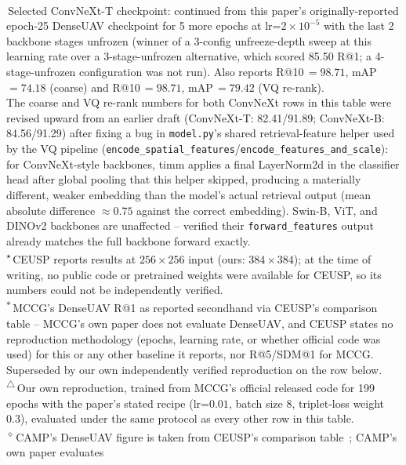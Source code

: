 \documentclass[conference]{IEEEtran}
\begin{document}
\begin{table}[htbp]
\vspace{2pt}
{\footnotesize
\textsuperscript{\ddag}\,Selected ConvNeXt-T checkpoint: continued from this
paper's originally-reported epoch-25 DenseUAV checkpoint for 5 more epochs
at lr=$2\times10^{-5}$ with the last 2 backbone stages unfrozen (winner of a
3-config unfreeze-depth sweep at this learning rate over a 3-stage-unfrozen
alternative, which scored 85.50 R@1; a 4-stage-unfrozen configuration was
not run). Also reports R@10\,$=98.71$, mAP\,$=74.18$ (coarse) and
R@10\,$=98.71$, mAP\,$=79.42$ (VQ re-rank).\\
The coarse and VQ re-rank numbers for both ConvNeXt rows in this table were
revised upward from an earlier draft (ConvNeXt-T: 82.41/91.89; ConvNeXt-B:
84.56/91.29) after fixing a bug in \texttt{model.py}'s shared
retrieval-feature helper used by the VQ pipeline
(\texttt{encode\_spatial\_features}/\texttt{encode\_features\_and\_scale}):
for ConvNeXt-style backbones, timm applies a final LayerNorm2d in the
classifier head after global pooling that this helper skipped, producing a
materially different, weaker embedding than the model's actual retrieval
output (mean absolute difference $\approx0.75$ against the correct
embedding). Swin-B, ViT, and DINOv2 backbones are unaffected -- verified
their \texttt{forward\_features} output already matches the full backbone
forward exactly.\\
\textsuperscript{$\star$}\,CEUSP reports results at $256\times256$ input
(ours: $384\times384$); at the time of writing, no public code or pretrained
weights were available for CEUSP, so its numbers could not be independently
verified.\\
\textsuperscript{$\ast$}\,MCCG's DenseUAV R@1 as reported secondhand via
CEUSP's comparison table \cite{xu2025ceusp} -- MCCG's own paper does not
evaluate DenseUAV, and CEUSP states no reproduction methodology (epochs,
learning rate, or whether official code was used) for this or any other
baseline it reports, nor R@5/SDM@1 for MCCG. Superseded by our own
independently verified reproduction on the row below.\\
\textsuperscript{$\triangle$}\,Our own reproduction, trained from MCCG's
official released code \cite{shen2024mccg} for 199 epochs with the paper's
stated recipe (lr=$0.01$, batch size 8, triplet-loss weight 0.3), evaluated
under the same protocol as every other row in this table.\\
\textsuperscript{$\diamond$}\,CAMP's DenseUAV figure is taken from CEUSP's
comparison table~\cite{xu2025ceusp}; CAMP's own paper evaluates
}
\end{table}
\end{document}
